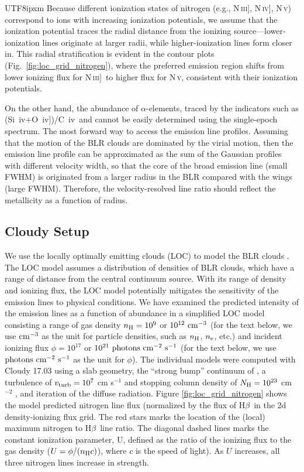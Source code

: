 \documentclass[linenumbers,trackchanges]{aastex701}
\def\NIII{N\,\textsc{iii]}}
\def\NIV{N\,\textsc{iv]}}
\def\NV{N\,\textsc{v}}
\def\hbeta{H$\beta$}
\def\nagao{(Si~{\sc iv}+O~{\sc iv]})/C~{\sc iv}}
\begin{document}
\begin{CJK*}{UTF8}{ipxm}
Because different ionization states of nitrogen (e.g., \NIII, \NIV, \NV) correspond to ions with increasing ionization potentials, we assume that the ionization potential traces the radial distance from the ionizing source—lower-ionization lines originate at larger radii, while higher-ionization lines form closer in. This radial stratification is evident in the contour plots (Fig.~\ref{fig:loc_grid_nitrogen}), where the preferred emission region shifts from lower ionizing flux for \NIII\ to higher flux for \NV, consistent with their ionization potentials.

On the other hand, the abundance of $\alpha$-elements, traced by the indicators such as \nagao\ and cannot be easily determined using the single-epoch spectrum. The most forward way to access the emission line profiles. Assuming that the motion of the BLR clouds are dominated by the virial motion, then the emission line profile can be approximated as the sum of the Gaussian profiles with different velocity width, so that the core of the broad emission line (small FWHM) is originated from a larger radius in the BLR compared with the wings (large FWHM). Therefore, the velocity-resolved line ratio should reflect the metallicity as a function of radius.  

\subsection{Cloudy Setup}
\label{sec:cloudy_setup}
We use the locally optimally emitting clouds (LOC) to model the BLR clouds \citep{Baldwin1995, Korista2004}. The LOC model assumes a distribution of densities of BLR clouds, which have a range of distance from the central continuum source. With its range of density and ionizing flux, the LOC model potentially mitigates the sensitivity of the emission lines to physical conditions.  We have examined the predicted intensity of the emission lines as a function of abundance in a simplified LOC model consisting a range of gas density $n_{\rm H} = 10^{9}$ or $10^{12}~\rm cm^{-3}$ (for the text below, we use $\rm cm^{-3}$ as the unit for particle densities, such as $n_{\rm H}$, $n_{\rm e}$, etc.) and incident ionizing flux $\phi = 10^{17}$ or $10^{21} ~\rm photons~cm^{-2}~s^{-1}$ (for the text below, we use $\rm photons~cm^{-2}~s^{-1}$ as the unit for $\phi$). The individual models were computed with Cloudy 17.03 using a slab geometry, the ``strong bump'' continuum of \cite{Nagao2006a}, a turbulence of $ v_{\rm turb} = 10^7 $ cm s$^{-1}$ and stopping column density of $N_{\rm H} = 10^{23}$ cm$^{-2}$ \citep{Baldwin1995}, and iteration of the diffuse radiation. Figure \ref{fig:loc_grid_nitrogen} shows the model predicted nitrogen line flux (normalized by the flux of \hbeta\ in the 2d density-ionizing flux grid. The red stars marks the location of the (local) maximum nitrogen to \hbeta\ line ratio. The diagonal dashed lines marks the constant ionization parameter, U, defined as the ratio of the ionizing flux to the gas density ($U  = \phi/(n_{\rm H}c)$), where $c$ is the speed of light). As $U$ increases, all three nitrogen lines increase in strength. 


\end{CJK*}
\end{document}
